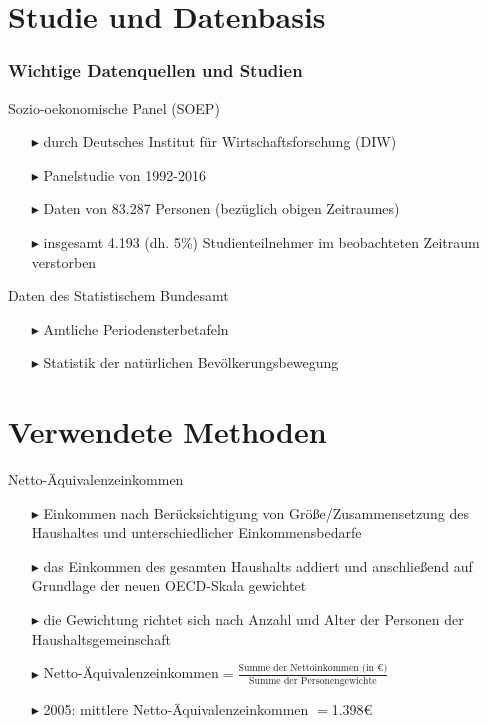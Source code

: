 \documentclass{beamer}
\begin{document}
\section{Studie und Datenbasis}
\begin{frame}
\frametitle{Wichtige Datenquellen und Studien}
  \begin{block}{Sozio-oekonomische Panel (SOEP)}
   \begin{itemize}
     \item [$\blacktriangleright$] durch Deutsches Institut für   Wirtschaftsforschung (DIW)
     \item [$\blacktriangleright$] Panelstudie von 1992-2016
     \item [$\blacktriangleright$] Daten von  83.287 Personen (bezüglich obigen Zeitraumes)
     \item[$\blacktriangleright$] insgesamt 4.193 (dh. 5\%) Studienteilnehmer im beobachteten Zeitraum verstorben
   \end{itemize}
  \end{block}
  \begin{block}{Daten des Statistischem Bundesamt}
   \begin{itemize}
     \item [$\blacktriangleright$] Amtliche Periodensterbetafeln
     \item [$\blacktriangleright$] Statistik der natürlichen Bevölkerungsbewegung
   \end{itemize}
  \end{block}
\end{frame}


\section{Verwendete Methoden}
\begin{frame}{Netto-Äquivalenzeinkommen}
	\begin{itemize}
		\item[$\blacktriangleright$] Einkommen nach Berücksichtigung von Größe/Zusammensetzung des Haushaltes und unterschiedlicher Einkommensbedarfe
		\item[$\blacktriangleright$]	das Einkommen des gesamten Haushalts addiert und anschließend auf Grundlage der neuen OECD-Skala gewichtet
		\item[$\blacktriangleright$] die Gewichtung richtet sich nach Anzahl und Alter der Personen der Haushaltsgemeinschaft
		\item[$\blacktriangleright$] Netto-Äquivalenzeinkommen$=\frac{\text{Summe der Nettoinkommen (in €)}}{\text{Summe der Personengewichte}}$
		\item[$\blacktriangleright$] 2005: mittlere Netto-Äquivalenzeinkommen $=$1.398€
	\end{itemize}
\end{frame}
\end{document}
